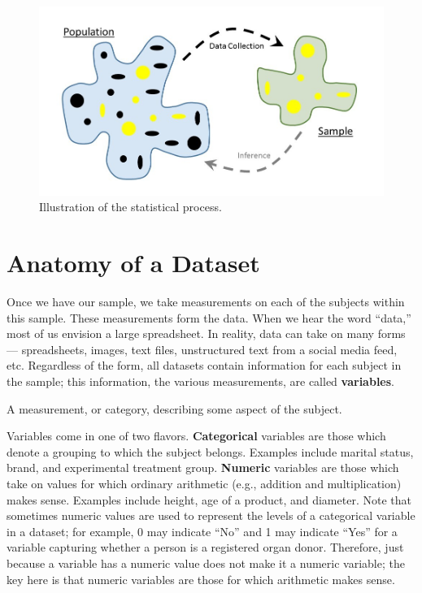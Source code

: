 \documentclass[]{book}
\theoremstyle{plain}
\theoremstyle{mydefn}
\theoremstyle{myexmpl}
\theoremstyle{remark}
\let\BeginKnitrBlock\begin \let\EndKnitrBlock\end
\let\BeginKnitrBlock\begin \let\EndKnitrBlock\end
\begin{document}
\begin{figure}

{\centering \includegraphics[width=0.8\linewidth]{images/Basics-Stat-Process} 

}

\caption{Illustration of the statistical process.}\label{fig:basics-statistical-process}
\end{figure}

\section{Anatomy of a Dataset}\label{anatomy-of-a-dataset}

Once we have our sample, we take measurements on each of the subjects
within this sample. These measurements form the data. When we hear the
word ``data,'' most of us envision a large spreadsheet. In reality, data
can take on many forms --- spreadsheets, images, text files,
unstructured text from a social media feed, etc. Regardless of the form,
all datasets contain information for each subject in the sample; this
information, the various measurements, are called \textbf{variables}.

\BeginKnitrBlock{definition}[Variable]
\protect\hypertarget{def:defn-variable}{}{\label{def:defn-variable}
{} }A measurement, or category, describing some
aspect of the subject.
\EndKnitrBlock{definition}

Variables come in one of two flavors. \textbf{Categorical} variables are
those which denote a grouping to which the subject belongs. Examples
include marital status, brand, and experimental treatment group.
\textbf{Numeric} variables are those which take on values for which
ordinary arithmetic (e.g., addition and multiplication) makes sense.
Examples include height, age of a product, and diameter. Note that
sometimes numeric values are used to represent the levels of a
categorical variable in a dataset; for example, 0 may indicate ``No''
and 1 may indicate ``Yes'' for a variable capturing whether a person is
a registered organ donor. Therefore, just because a variable has a
numeric value does not make it a numeric variable; the key here is that
numeric variables are those for which arithmetic makes sense.
\end{document}
